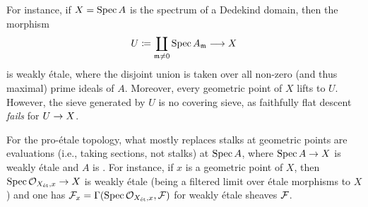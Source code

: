 \documentclass[a4paper, 10pt, oneside, DIV=9, chapterprefix=true, numbers=enddot, bibliography=totoc]{scrbook}
\begin{document}
For instance, if $X=\operatorname{Spec} A$ is the spectrum of a Dedekind domain, then the morphism
\begin{equation*}
	U\coloneqq\coprod_{\mm\neq 0}\Spec A_\mm\morphism X
\end{equation*}
is weakly étale, where the disjoint union is taken over all non-zero (and thus maximal) prime ideals of $A$. Moreover, every geometric point of $X$ lifts to $U$. However, the sieve generated by $U$ is no covering sieve, as faithfully flat descent \emph{fails} for $U\morphism X$.

For the pro-étale topology, what mostly replaces stalks at geometric points are evaluations (i.e., taking sections, not stalks) at $\operatorname{Spec} A$, where $\Spec A\morphism X$ is weakly étale and $A$ is . For instance, if $x$ is a geometric point of $X$,  then $\Spec \Oo_{X_\et,x}\morphism X$ is weakly étale (being a filtered limit over étale morphisms to $X$) and one has $\mathcal{F}_x=\operatorname{\Gamma}(\operatorname{Spec} \mathcal{O}_{X_{\mathrm{\acute{e}t}},x},\mathcal{F})$ for weakly étale sheaves $\mathcal{F}$.
\end{document}

